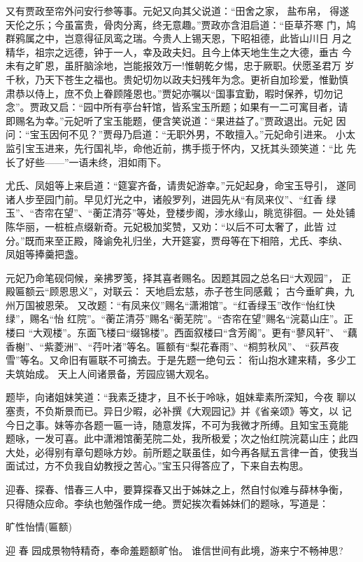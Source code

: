 又有贾政至帘外问安行参等事。元妃又向其父说道：“田舍之家，盐布帛，
得遂天伦之乐；今虽富贵，骨肉分离，终无意趣。”贾政亦含泪启道：“臣草芥寒
门，鸠群鸦属之中，岂意得征凤鸾之瑞。今贵人上锡天恩，下昭祖德，此皆山川日
月之精华，祖宗之远德，钟于一人，幸及政夫妇。且今上体天地生生之大德，垂古
今未有之旷恩，虽肝脑涂地，岂能报效万一!惟朝乾夕惕，忠于厥职。伏愿圣君万
岁千秋，乃天下苍生之福也。贵妃切勿以政夫妇残年为念。更祈自加珍爱，惟勤慎
肃恭以侍上，庶不负上眷顾隆恩也。”贾妃亦嘱以“国事宜勤，暇时保养，切勿记
念”。贾政又启：“园中所有亭台轩馆，皆系宝玉所题；如果有一二可寓目者，请
即赐名为幸。”元妃听了宝玉能题，便含笑说道：“果进益了。”贾政退出。元妃
因问：“宝玉因何不见？”贾母乃启道：“无职外男，不敢擅入。”元妃命引进来。
小太监引宝玉进来，先行国礼毕，命他近前，携手揽于怀内，又抚其头颈笑道：“比
先长了好些——”一语未终，泪如雨下。

尤氏、凤姐等上来启道：“筵宴齐备，请贵妃游幸。”元妃起身，命宝玉导引，
遂同诸人步至园门前。早见灯光之中，诸般罗列，进园先从“有凤来仪”、“红香
绿玉”、“杏帘在望”、“蘅芷清芬”等处，登楼步阁，涉水缘山，眺览徘徊。一
处处铺陈华丽，一桩桩点缀新奇。元妃极加奖赞，又劝：“以后不可太奢了，此皆
过分。”既而来至正殿，降谕免礼归坐，大开筵宴，贾母等在下相陪，尤氏、李纨、
凤姐等捧羹把盏。

元妃乃命笔砚伺候，亲拂罗笺，择其喜者赐名。因题其园之总名曰“大观园”，
正殿匾额云“顾恩思义”，对联云：
天地启宏慈，赤子苍生同感戴；
古今垂旷典，九州万国被恩荣。
又改题：“有凤来仪”赐名“潇湘馆”。“红香绿玉”改作“怡红快绿”，赐名“怡
红院”。“蘅芷清芬”赐名“蘅芜院”。“杏帘在望”赐名“浣葛山庄”。正楼曰
“大观楼”。东面飞楼曰“缀锦楼”。西面叙楼曰“含芳阁”。更有“蓼风轩”、
“藕香榭”、“紫菱洲”、“荇叶渚”等名。匾额有“梨花春雨”、“桐剪秋风”、
“荻芦夜雪”等名。又命旧有匾联不可摘去。于是先题一绝句云：
衔山抱水建来精，多少工夫筑始成。
天上人间诸景备，芳园应锡大观名。

题毕，向诸姐妹笑道：“我素乏捷才，且不长于呤咏，姐妹辈素所深知，今夜
聊以塞责，不负斯景而已。异日少暇，必补撰《大观园记》并《省亲颂》等文，以
记今日之事。妹等亦各题一匾一诗，随意发挥，不可为我微才所缚。且知宝玉竟能
题咏，一发可喜。此中潇湘馆蘅芜院二处，我所极爱；次之怡红院浣葛山庄；此四
大处，必得别有章句题咏方妙。前所题之联虽佳，如今再各赋五言律一首，使我当
面试过，方不负我自幼教授之苦心。”宝玉只得答应了，下来自去构思。

迎春、探春、惜春三人中，要算探春又出于姊妹之上，然自忖似难与薛林争衡，
只得随众应命。李纨也勉强作成一绝。贾妃挨次看姊妹们的题咏，写道是：

旷性怡情(匾额)

迎
春
园成景物特精奇，奉命羞题额旷怡。
谁信世间有此境，游来宁不畅神思?

